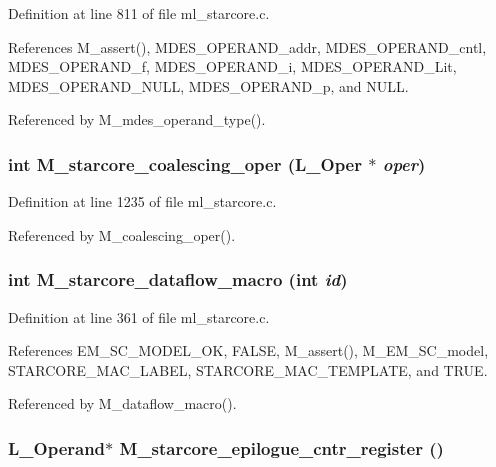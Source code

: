 Definition at line 811 of file ml\_\-starcore.c.

References M\_\-assert(), MDES\_\-OPERAND\_\-addr, MDES\_\-OPERAND\_\-cntl, MDES\_\-OPERAND\_\-f, MDES\_\-OPERAND\_\-i, MDES\_\-OPERAND\_\-Lit, MDES\_\-OPERAND\_\-NULL, MDES\_\-OPERAND\_\-p, and NULL.

Referenced by M\_\-mdes\_\-operand\_\-type().
\subsubsection{\setlength{\rightskip}{0pt plus 5cm}int M\_\-starcore\_\-coalescing\_\-oper (L\_\-Oper $\ast$ {\em oper})}\label{ml__starcore_8c_244457bd3b54ee0279ff6209fda41d31}




Definition at line 1235 of file ml\_\-starcore.c.

Referenced by M\_\-coalescing\_\-oper().
\subsubsection{\setlength{\rightskip}{0pt plus 5cm}int M\_\-starcore\_\-dataflow\_\-macro (int {\em id})}\label{ml__starcore_8c_972aabcc8b107edc48c5e85e2b1d211e}




Definition at line 361 of file ml\_\-starcore.c.

References EM\_\-SC\_\-MODEL\_\-OK, FALSE, M\_\-assert(), M\_\-EM\_\-SC\_\-model, STARCORE\_\-MAC\_\-LABEL, STARCORE\_\-MAC\_\-TEMPLATE, and TRUE.

Referenced by M\_\-dataflow\_\-macro().
\subsubsection{\setlength{\rightskip}{0pt plus 5cm}L\_\-Operand$\ast$ M\_\-starcore\_\-epilogue\_\-cntr\_\-register ()}\label{ml__starcore_8c_922691e8e0050b73de9f008389477b18}





